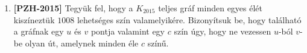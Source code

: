 \documentclass[a4paper,12pt]{article}
\begin{document}
\begin{enumerate}
        \item \textbf{[PZH-2015]} Tegyük fel, hogy a  $K_{2015}$ teljes gráf minden egyes élét kiszíneztük $1008$ lehetséges szín valamelyikére. Bizonyítsuk be, hogy található a gráfnak egy $u$ és $v$ pontja valamint egy $c$ szín úgy, hogy ne vezessen $u$-ból $v$-be olyan út, amelynek minden éle $c$ színű.



    \end{enumerate}
\end{document}
